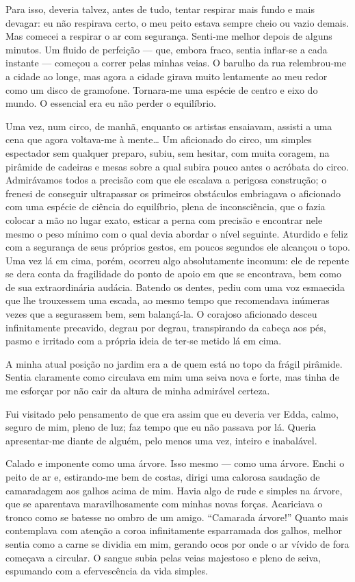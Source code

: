 Para isso, deveria talvez, antes de tudo, tentar respirar mais fundo e mais devagar: eu não respirava certo, o meu peito estava sempre cheio ou vazio demais. Mas comecei a respirar o ar com segurança. Senti-me melhor depois de alguns minutos. Um fluido de perfeição --- que, embora fraco, sentia inflar-se a cada instante --- começou a correr pelas minhas veias. O barulho da rua relembrou-me a cidade ao longe, mas agora a cidade girava muito lentamente ao meu redor como um disco de gramofone. Tornara-me uma espécie de centro e eixo do mundo. O essencial era eu não perder o equilíbrio.

Uma vez, num circo, de manhã, enquanto os artistas ensaiavam, assisti a uma cena que agora voltava-me à mente\ldots{} Um aficionado do circo, um simples espectador sem qualquer preparo, subiu, sem hesitar, com muita coragem, na pirâmide de cadeiras e mesas sobre a qual subira pouco antes o acróbata do circo. Admirávamos todos a precisão com que ele escalava a perigosa construção; o frenesi de conseguir ultrapassar os primeiros obstáculos embriagava o aficionado com uma espécie de ciência do equilíbrio, plena de inconsciência, que o fazia colocar a mão no lugar exato, esticar a perna com precisão e encontrar nele mesmo o peso mínimo com o qual devia abordar o nível seguinte. Aturdido e feliz com a segurança de seus próprios gestos, em poucos segundos ele alcançou o topo. Uma vez lá em cima, porém, ocorreu algo absolutamente incomum: ele de repente se dera conta da fragilidade do ponto de apoio em que se encontrava, bem como de sua extraordinária audácia. Batendo os dentes, pediu com uma voz esmaecida que lhe trouxessem uma escada, ao mesmo tempo que recomendava inúmeras vezes que a segurassem bem, sem balançá-la. O corajoso aficionado desceu infinitamente precavido, degrau por degrau, transpirando da cabeça aos pés, pasmo e irritado com a própria ideia de ter-se metido lá em cima.

A minha atual posição no jardim era a de quem está no topo da frágil pirâmide. Sentia claramente como circulava em mim uma seiva nova e forte, mas tinha de me esforçar por não cair da altura de minha admirável certeza.

Fui visitado pelo pensamento de que era assim que eu deveria ver Edda, calmo, seguro de mim, pleno de luz; faz tempo que eu não passava por lá. Queria apresentar-me diante de alguém, pelo menos uma vez, inteiro e inabalável.

Calado e imponente como uma árvore. Isso mesmo --- como uma árvore. Enchi o peito de ar e, estirando-me bem de costas, dirigi uma calorosa saudação de camaradagem aos galhos acima de mim. Havia algo de rude e simples na árvore, que se aparentava maravilhosamente com minhas novas forças. Acariciava o tronco como se batesse no ombro de um amigo. ``Camarada árvore!'' Quanto mais contemplava com atenção a coroa infinitamente esparramada dos galhos, melhor sentia como a carne se dividia em mim, gerando ocos por onde o ar vívido de fora começava a circular. O sangue subia pelas veias majestoso e pleno de seiva, espumando com a efervescência da vida simples.

